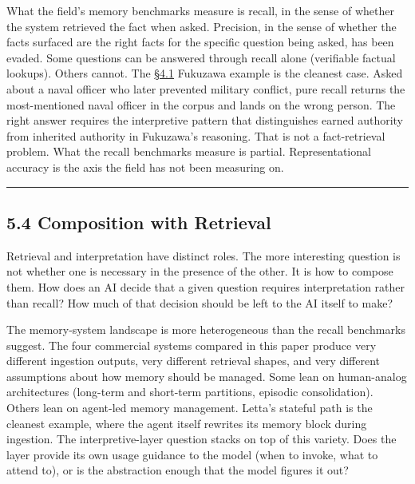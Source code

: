 What the field's memory benchmarks measure is recall, in the sense of
whether the system retrieved the fact when asked. Precision, in the
sense of whether the facts surfaced are the right facts for the specific
question being asked, has been evaded. Some questions can be answered
through recall alone (verifiable factual lookups). Others cannot. The
\hyperref[the-cross-subject-gradient-and-its-per-question-mechanism]{§4.1} Fukuzawa example is the cleanest case. Asked about a naval officer
who later prevented military conflict, pure recall returns the
most-mentioned naval officer in the corpus and lands on the wrong
person. The right answer requires the interpretive pattern that
distinguishes earned authority from inherited authority in Fukuzawa's
reasoning. That is not a fact-retrieval problem. What the recall
benchmarks measure is partial. Representational accuracy is the axis the
field has not been measuring on.

\begin{center}\rule{0.5\linewidth}{0.5pt}\end{center}

\hypertarget{composition-with-retrieval}{%
\subsection{5.4 Composition with
Retrieval}\label{composition-with-retrieval}}

Retrieval and interpretation have distinct roles. The more interesting
question is not whether one is necessary in the presence of the other.
It is how to compose them. How does an AI decide that a given question
requires interpretation rather than recall? How much of that decision
should be left to the AI itself to make?

The memory-system landscape is more heterogeneous than the recall
benchmarks suggest. The four commercial systems compared in this paper
produce very different ingestion outputs, very different retrieval
shapes, and very different assumptions about how memory should be
managed. Some lean on human-analog architectures (long-term and
short-term partitions, episodic consolidation). Others lean on agent-led
memory management. Letta's stateful path is the cleanest example, where
the agent itself rewrites its memory block during ingestion. The
interpretive-layer question stacks on top of this variety. Does the
layer provide its own usage guidance to the model (when to invoke, what
to attend to), or is the abstraction enough that the model figures it
out?

